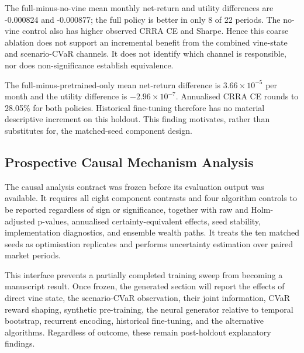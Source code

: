 The full-minus-no-vine mean monthly net-return and utility differences are -0.000824 and -0.000877; the full policy is better in only 8 of 22 periods. The no-vine control also has higher observed CRRA CE and Sharpe. Hence this coarse ablation does not support an incremental benefit from the combined vine-state and scenario-CVaR channels. It does not identify which channel is responsible, nor does non-significance establish equivalence.

The full-minus-pretrained-only mean net-return difference is $3.66\times10^{-5}$ per month and the utility difference is $-2.96\times10^{-7}$. Annualised CRRA CE rounds to 28.05\% for both policies. Historical fine-tuning therefore has no material descriptive increment on this holdout. This finding motivates, rather than substitutes for, the matched-seed component design.

\subsection{Prospective Causal Mechanism Analysis}
\label{subsec:4_causal_results}

The causal analysis contract was frozen before its evaluation output was available. It requires all eight component contrasts and four algorithm controls to be reported regardless of sign or significance, together with raw and Holm-adjusted p-values, annualised certainty-equivalent effects, seed stability, implementation diagnostics, and ensemble wealth paths. It treats the ten matched seeds as optimisation replicates and performs uncertainty estimation over paired market periods.


This interface prevents a partially completed training sweep from becoming a manuscript result. Once frozen, the generated section will report the effects of direct vine state, the scenario-CVaR observation, their joint information, CVaR reward shaping, synthetic pre-training, the neural generator relative to temporal bootstrap, recurrent encoding, historical fine-tuning, and the alternative algorithms. Regardless of outcome, these remain post-holdout explanatory findings.

